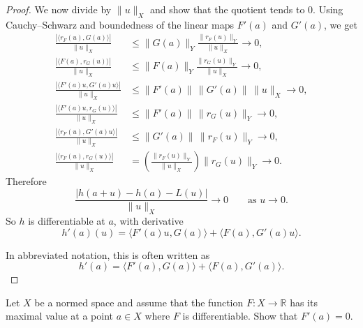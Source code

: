 \begin{proof}
    We now divide by $\|u\|_X$ and show that the quotient tends to 
    $0$.
    Using Cauchy--Schwarz and boundedness of the linear maps 
    $F'(a)$ and $G'(a)$,
    we get
    \begin{align*}
        \frac{|\langle r_F(u),G(a)\rangle|}{\|u\|_X}
        &\le \|G(a)\|_Y \frac{\|r_F(u)\|_Y}{\|u\|_X} \to 0, \\
        \frac{|\langle F(a),r_G(u)\rangle|}{\|u\|_X}
        &\le \|F(a)\|_Y \frac{\|r_G(u)\|_Y}{\|u\|_X} \to 0, \\
        \frac{|\langle F'(a)u,G'(a)u\rangle|}{\|u\|_X}
        &\le \|F'(a)\|\,\|G'(a)\|\,\|u\|_X \to 0, \\
        \frac{|\langle F'(a)u,r_G(u)\rangle|}{\|u\|_X}
        &\le \|F'(a)\|\,\|r_G(u)\|_Y \to 0, \\
        \frac{|\langle r_F(u),G'(a)u\rangle|}{\|u\|_X}
        &\le \|G'(a)\|\,\|r_F(u)\|_Y \to 0, \\
        \frac{|\langle r_F(u),r_G(u)\rangle|}{\|u\|_X}
        &=
        \left(\frac{\|r_F(u)\|_Y}{\|u\|_X}\right)\|r_G(u)\|_Y \to 0.
    \end{align*}
    Therefore
    \[
        \frac{|h(a+u)-h(a)-L(u)|}{\|u\|_X} \to 0
        \qquad\text{as } u\to 0.
    \]
    So $h$ is differentiable at $a$, with derivative
    \[
        h'(a)(u)=\langle F'(a)u,G(a)\rangle+\langle F(a),
        G'(a)u\rangle.
    \]

    In abbreviated notation, this is often written as
    \[
        h'(a)=\langle F'(a),G(a)\rangle+\langle F(a),G'(a)\rangle.
    \]
\end{proof}
\begin{prob}
    Let $X$ be a normed space and assume that the function 
    $F : X \to \mathbb R$ has its maximal value at a point 
    $a \in X$ where $F$ is differentiable. Show that 
    $F'(a) = 0$.
\end{prob}
